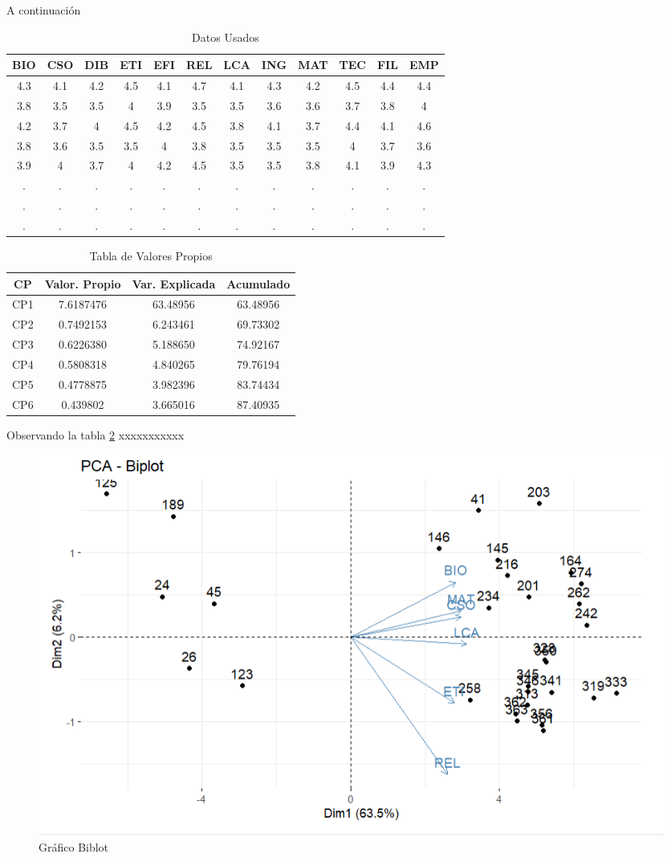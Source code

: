 \documentclass[12pt,a4paper,]{book}
\newcommand{\bcenter}{\begin{center}}
\newcommand{\ecenter}{\end{center}}
\numberwithin{dummy}{section}
\theoremstyle{ocrenumbox}
\theoremstyle{ocrenumbox}
\theoremstyle{ocrenumbox}
\theoremstyle{ocrenumbox}
\theoremstyle{ocrenum}
\begin{document}
A continuación

\begin{table}[!ht]
\caption{Datos Usados}
\label{tabla1c}
\bcenter
\begin{tabular}{cccccccccccc}\hline
BIO & CSO & DIB & ETI & EFI & REL & LCA & ING & MAT & TEC & FIL & EMP \\\hline
4.3 & 4.1 & 4.2 & 4.5 & 4.1 & 4.7 & 4.1 & 4.3 & 4.2 & 4.5 & 4.4 & 4.4 \\
3.8 & 3.5 & 3.5 & 4 & 3.9 & 3.5 & 3.5 & 3.6 & 3.6 & 3.7 & 3.8 & 4 \\
4.2 & 3.7 & 4 & 4.5 & 4.2 & 4.5 & 3.8 & 4.1 & 3.7 & 4.4 & 4.1 & 4.6 \\
3.8 & 3.6 & 3.5 & 3.5 & 4 & 3.8 & 3.5 & 3.5 & 3.5 & 4 & 3.7 & 3.6 \\
3.9 & 4 & 3.7 & 4 & 4.2 & 4.5 & 3.5 & 3.5 & 3.8 & 4.1 & 3.9 & 4.3 \\
. & . & . & . & . & . & . & . & . & . & . & . \\
. & . & . & . & . & . & . & . & . & . & . & . \\
. & . & . & . & . & . & . & . & . & . & . & .\\\hline
\end{tabular}
\ecenter
\end{table}

\begin{table}[!ht]
\caption{Tabla de Valores Propios}
\label{tabla1b}
\bcenter
\begin{tabular}{cccc}\hline
CP & Valor. Propio & Var. Explicada & Acumulado \\\hline
CP1 & 7.6187476 & 63.48956 & 63.48956 \\
CP2 & 0.7492153 & 6.243461 & 69.73302 \\
CP3 & 0.6226380 & 5.188650 & 74.92167 \\
CP4 & 0.5808318 & 4.840265 & 79.76194 \\
CP5 & 0.4778875 & 3.982396 & 83.74434 \\
CP6 & 0.439802 & 3.665016 & 87.40935\\\hline
\end{tabular}
\ecenter
\end{table}

Observando la tabla \ref{tabla1b} xxxxxxxxxxx

\begin{figure}[H]

{\centering \includegraphics[width=0.7\linewidth]{Graficas/graf5} 

}

\caption{Gráfico Biblot}\label{fig:grafica1b}
\end{figure}
\end{document}
